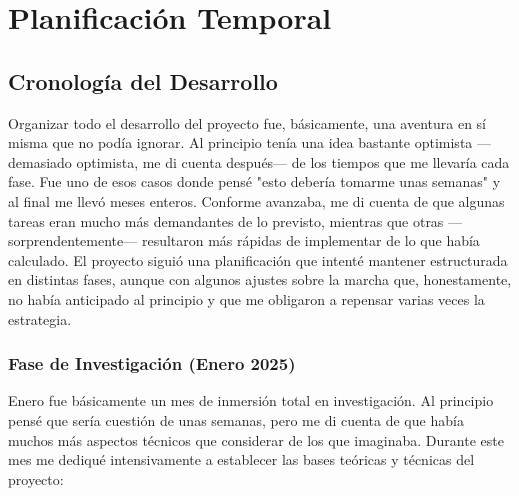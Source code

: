 \chapter{Planificación Temporal}\label{ch:temporal_scheduling}

\section{Cronología del Desarrollo}

Organizar todo el desarrollo del proyecto fue, básicamente, una aventura en sí misma que no podía ignorar. Al principio tenía una idea bastante optimista —demasiado optimista, me di cuenta después— de los tiempos que me llevaría cada fase. Fue uno de esos casos donde pensé "esto debería tomarme unas semanas" y al final me llevó meses enteros. Conforme avanzaba, me di cuenta de que algunas tareas eran mucho más demandantes de lo previsto, mientras que otras —sorprendentemente— resultaron más rápidas de implementar de lo que había calculado. El proyecto siguió una planificación que intenté mantener estructurada en distintas fases, aunque con algunos ajustes sobre la marcha que, honestamente, no había anticipado al principio y que me obligaron a repensar varias veces la estrategia.

\subsection{Fase de Investigación (Enero 2025)}

Enero fue básicamente un mes de inmersión total en investigación. Al principio pensé que sería cuestión de unas semanas, pero me di cuenta de que había muchos más aspectos técnicos que considerar de los que imaginaba. Durante este mes me dediqué intensivamente a establecer las bases teóricas y técnicas del proyecto:

